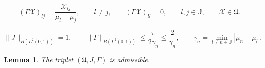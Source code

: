 \documentclass[10pt,a4paper]{amsart}
\newtheorem{lemma}{Lemma}
\begin{document}
\begin{equation}\label{gamma}
(\Gamma\mathcal{X})_{lj}=\frac{\mathcal{X}_{lj}}{\mu_l-\mu_j},
\qquad l\ne j, \qquad (\Gamma\mathcal{X})_{ll}=0, \qquad l, j\in\mathbb{J},
\qquad \mathcal{X}\in\mathfrak{U}.
\end{equation}

\begin{equation}\label{estJG}
\|J\|_{B(L^2(0, 1))}=1, \qquad \|\Gamma\|_{B(L^2(0, 1))}\leqslant\frac{\pi}{2\gamma_n}\leqslant\frac{2}{\gamma_n},
\qquad \gamma_n=\min_{l\ne n\in\mathbb{J}}|\mu_n-\mu_l|.
\end{equation}

\begin{lemma}\label{lh1}
The triplet $(\mathfrak{U}, J, \Gamma)$ is admissible.
\end{lemma}
\end{document}
